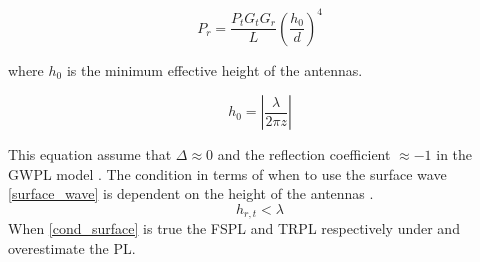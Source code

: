 \begin{equation}
P_r=\frac{P_t G_t G_r }{L}\left(\frac{h_0}{d}\right)^4
\label{surface_wave}
\end{equation}

where $h_0$ is the minimum effective height of the antennas. 

\begin{equation}
h_{0} = |\frac{\lambda}{2\pi z}|
\label{h_0}
\end{equation}

This equation assume that $\Delta \approx 0$ and the reflection coefficient $\approx -1$ in the GWPL model \cite{Chong}. The condition in terms of when to use the surface wave \eqref{surface_wave} is dependent on the height of the antennas \cite{Chong}.
\begin{equation}
h_{r,t} < \lambda
\label{cond_surface}
\end{equation}
When \eqref{cond_surface} is true the FSPL and TRPL respectively under and overestimate the PL.
